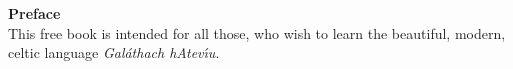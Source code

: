 \begin{center}
\textbf{Preface}\\
\bigskip
This free book is intended for all those, who wish to learn the beautiful, modern, celtic language \textit{Gal\'{a}thach hAtev\'{\i}u}.
\end{center}
